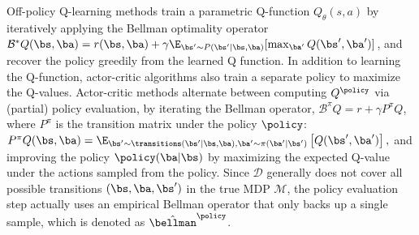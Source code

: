 Off-policy Q-learning methods train a parametric Q-function $Q_\theta(s, a)$ by iteratively applying the Bellman optimality operator \mbox{$\mathcal{B}^*Q(\bs, \ba) = r(\bs, \ba) + \gamma \E_{\bs' \sim P(\bs'|\bs, \ba)}[\max_{\ba'} Q(\bs', \ba')]$}, and recover the policy greedily from the learned Q function. In addition to learning the Q-function, actor-critic algorithms also train a separate policy to maximize the Q-values.
Actor-critic methods alternate between computing $Q^\policy$ via (partial) policy evaluation,
by iterating the Bellman operator, $\mathcal{B}^\pi Q= r + \gamma P^\pi Q$, where $P^\pi$ is the transition matrix under the policy $\policy$: $P^\pi Q(\bs, \ba) = \E_{\bs' \sim \transitions(\bs' | \bs, \ba), \ba' \sim \pi(\ba'|\bs')} \left[ Q(\bs', \ba') \right],$
and improving the policy
$\policy(\ba|\bs)$ by maximizing the expected Q-value under the actions sampled from the policy. Since $\mathcal{D}$ generally does not cover all possible transitions $(\bs, \ba, \bs')$ in the true MDP $\mathcal{M}$, the policy evaluation step actually uses an empirical Bellman operator that only backs up a single sample, which is denoted as $\hat{\bellman}^\policy$.

